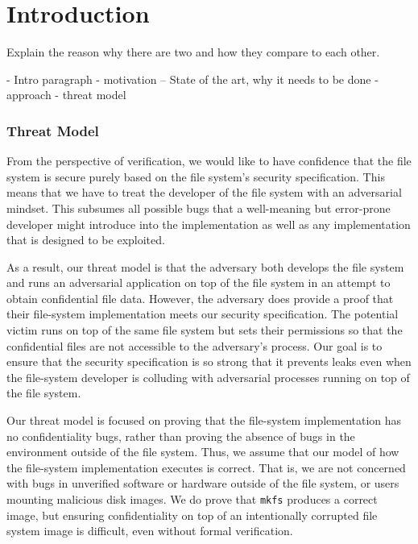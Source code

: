 \chapter{Introduction}

Explain the reason why there are two and how they compare to each other.

- Intro paragraph 
- motivation
-- State of the art, why it needs to be done
- approach
- threat model

\subsection{Threat Model}
From the perspective of verification, we would like to have confidence
that the file system is secure purely based on the file system's security
specification.  This means that we have to treat the developer of the
file system with an adversarial mindset.  This subsumes all possible
bugs that a well-meaning but error-prone developer might introduce into
the implementation as well as any implementation that is designed to be exploited.

As a result, our threat model is that the adversary both develops the
file system and runs an adversarial application on top of the file system
in an attempt to obtain confidential file data.  However, the adversary
does provide a proof that their file-system implementation meets our
security specification.  The potential victim runs on top of the same
file system but sets their permissions so that the confidential files
are not accessible to the adversary's process.  Our goal is to ensure
that the security specification is so strong that it prevents leaks even
when the file-system developer is colluding with adversarial processes
running on top of the file system.

Our threat model is focused on proving that the file-system implementation has
no confidentiality bugs, rather than proving the absence of bugs in the
environment outside of the file system. Thus, we assume that our model
of how the file-system implementation executes is correct.  That is, we are not
concerned with bugs in unverified software or hardware outside of the file
system, or users mounting malicious disk images.  We do prove that
\texttt{mkfs} produces a correct image, but ensuring confidentiality on top of an
intentionally corrupted file system image is difficult, even without formal
verification. 

